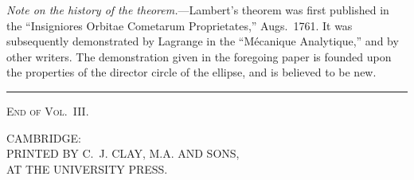\documentclass[11pt,a4paper]{book}
\providecommand{\mypar}{\par}
\begin{document}
\mypar
\textit{Note on the history of the theorem.}---Lambert's theorem was first
published in the ``Insigniores Orbitae Cometarum Proprietates,'' Augs.~1761.
It was subsequently demonstrated by Lagrange in the ``M\'ecanique Analytique,''
and by other writers. The demonstration given in the foregoing paper is founded
upon the properties of the director circle of the ellipse, and is believed to
be new.

\vspace{2cm}

\begin{center}
\rule{0.4\textwidth}{0.4pt}
\end{center}

\vspace{1cm}

\begin{center}
\textsc{End of Vol.~III.}
\end{center}

\vspace{2cm}

\begin{center}
CAMBRIDGE:\\
PRINTED BY C.~J. CLAY, M.A. AND SONS,\\
AT THE UNIVERSITY PRESS.
\end{center}
\clearpage
\end{document}
